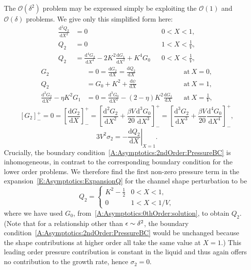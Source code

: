 \documentclass{jfm}
\newcommand{\dd}[2]{\frac{\mathrm{d} #1}{\mathrm{d} #2}}
\newcommand{\poisson}{\eta} %
\begin{document}
The  $\mathcal{O}(\delta^2)$ problem may be expressed simply be exploiting the  $\mathcal{O}(1)$ and $\mathcal{O}(\delta)$ problems. We give only this simplified form here:
\begin{align}
 \dd{^2 Q_2}{X^2}&=0 & &0 < X<1,\\
Q_2 &= 0 & &1 < X< \frac{1}{V},\\
Q_2 &= \dd{^4 G_2}{X^4} - 2K^2\dd{G_1}{X^2}+ K^4 G_0 & & 0 < X < \frac{1}{V},
\end{align}
\begin{align}
G_2 &= 0 = \dd{G_2}{X}= \dd{Q_2}{X} & &\text{at}~X = 0,\\
Q_2 &=G_0+ K^2+ \dd{\psi}{X} & &\text{at}~X = 1,\label{A:Asymptotics:2ndOrder:PressureBC}\\
\dd{^2 G_2}{X^2} - \poisson K^2 G_1 &=0 = \dd{^3 G_0}{X^3}  - (2- \poisson)K^2 \dd{G_1}{X}& &\text{at}~X = \frac{1}{V},
\end{align}
\begin{equation}
\left[G_2\right]_-^+ =0 = \left[\dd{G_2}{X}\right]_-^+ = \left[\dd{^2 G_2}{X^2} + \frac{\beta V}{20}\dd{^3G_0}{X^3}\right]_-^+ = \left[\dd{^3 G_2}{X^3} + \frac{\beta V}{20}\dd{^4 G_0}{X^4}\right]_-^+,
\end{equation}
\begin{equation}
3V^2 \sigma_2 = -\left.\dd{Q_2}{X}\right|_{X=1}.
\end{equation}
Crucially, the boundary condition~\eqref{A:Asymptotics:2ndOrder:PressureBC} is inhomogeneous, in contrast to the corresponding boundary condition for the lower order problems. We therefore find the first non-zero pressure term in the expansion~\eqref{E:Asymptotics:ExpansionQ} for the channel shape perturbation to be
\begin{equation}\label{A:Asymptotics:2ndOrder:solQ2}
Q_2 = \begin{cases}
K^2 - \frac{1}{2} & 0 <X  < 1,\\
0 & 1 < X < 1/V,
\end{cases}
\end{equation}
where we have used $G_0$, from~\eqref{A:Asymptotics:0thOrder:solution}, to obtain $Q_2$. (Note that for a relationship other than $\epsilon\sim \delta^2$, the boundary condition~\eqref{A:Asymptotics:2ndOrder:PressureBC} would be unchanged because the shape contributions at higher order all take the same value at $ X= 1$.) This leading order pressure contribution is constant in the liquid and thus again offers no contribution to the growth rate, hence $\sigma_2 = 0$.
\end{document}
